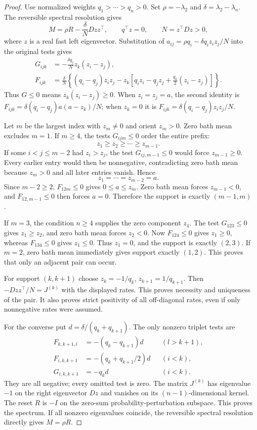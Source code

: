 \begin{proof}
Use normalized weights $q_1>\cdots>q_n>0$.
Set $\rho=-\lambda_2$ and $\delta=\lambda_2-\lambda_n$.
The reversible spectral resolution gives
\[
M=\rho R-\frac{\delta}{N}Dzz^\top,
\qquad q^\top z=0,\qquad N=z^\top Dz>0,
\]
where $z$ is a real fast left eigenvector. Substitution of
$a_{ij}=\rho q_i-\delta q_i z_i z_j/N$ into the original tests gives
\begin{align*}
G_{ijk}&=-\frac{\delta q_j}{N}z_k(z_i-z_j),\\
F_{ijk}&=\frac{\delta}{N}\left\{
(q_i-q_j)z_i z_j-z_k\left[q_i z_i-q_j z_j
 +\frac{q_k}{2}(z_i-z_j)\right]\right\}.
\end{align*}
Thus $G\leq0$ means $z_k(z_i-z_j)\geq0$.
When $z_i=z_j=a$, the second identity is
$F_{ijk}=\delta(q_i-q_j)a(a-z_k)/N$; when $z_k=0$ it is
$F_{ijk}=\delta(q_i-q_j)z_i z_j/N$.

Let $m$ be the largest index with $z_m\ne0$ and orient $z_m>0$.
Zero bath mean excludes $m=1$.
If $m\geq4$, the tests $G_{ijm}\leq0$ order the entire prefix:
\[
z_1\geq z_2\geq\cdots\geq z_{m-1}.
\]
If some $i<j\leq m-2$ had $z_i>z_j$, the test
$G_{ij,m-1}\leq0$ would force $z_{m-1}\geq0$.
Every earlier entry would then be nonnegative, contradicting zero bath
mean because $z_m>0$ and all later entries vanish. Hence
\[
z_1=\cdots=z_{m-2}=a.
\]
Since $m-2\geq2$, $F_{12m}\leq0$ gives $0\leq a\leq z_m$.
Zero bath mean forces $z_{m-1}<0$, and $F_{12,m-1}\leq0$
then forces $a=0$. Therefore the support is exactly $(m-1,m)$.

If $m=3$, the condition $n\geq4$ supplies the zero component $z_4$.
The test $G_{123}\leq0$ gives $z_1\geq z_2$, and zero bath mean
forces $z_2<0$. Now $F_{124}\leq0$ gives $z_1\geq0$, whereas
$F_{134}\leq0$ gives $z_1\leq0$. Thus $z_1=0$, and the support
is exactly $(2,3)$. If $m=2$, zero bath mean immediately gives support
exactly $(1,2)$. This proves that only an adjacent pair can occur.

For support $(k,k+1)$ choose
$z_k=-1/q_k$, $z_{k+1}=1/q_{k+1}$.
Then $-Dzz^\top/N=J^{(k)}$ with the displayed rates. This proves
necessity and uniqueness of the pair. It also proves strict positivity
of all off-diagonal rates, even if only nonnegative rates were assumed.

For the converse put $d=\delta/(q_k+q_{k+1})$.
The only nonzero triplet tests are
\begin{align*}
F_{k,k+1,l}&=-(q_k-q_{k+1})d &&(l>k+1),\\
F_{i,k,k+1}&=-(q_k+q_{k+1}/2)d &&(i<k),\\
G_{i,k,k+1}&=-q_kd &&(i<k).
\end{align*}
They are all negative; every omitted test is zero.
The matrix $J^{(k)}$ has eigenvalue $-1$ on the right eigenvector
$Dz$ and vanishes on its $(n-1)$-dimensional kernel. The reset $R$
is $-I$ on the zero-sum probability-perturbation subspace. This proves
the spectrum. If all nonzero eigenvalues coincide, the reversible
spectral resolution directly gives $M=\rho R$.


\end{proof}
